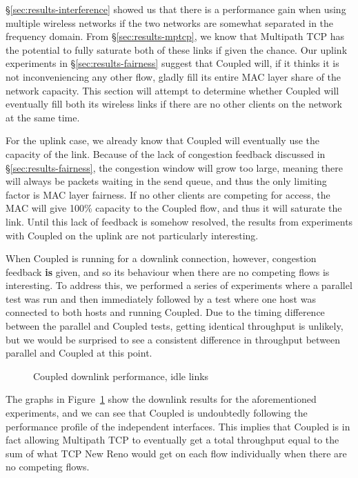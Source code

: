 \S\ref{sec:results-interference} showed us that there is a performance
gain when using multiple wireless networks if the two networks are somewhat 
separated in the frequency domain. From \S\ref{sec:results-mptcp}, we know that 
Multipath TCP has the potential to fully saturate both of these links if given 
the chance. Our uplink experiments in \S\ref{sec:results-fairness} suggest that 
Coupled will, if it thinks it is not inconveniencing any other flow, gladly fill 
its entire MAC layer share of the network capacity. This section will attempt to 
determine whether Coupled will eventually fill both its wireless links if there 
are no other clients on the network at the same time.

For the uplink case, we already know that Coupled will eventually use the
capacity of the link. Because of the lack of congestion feedback discussed in
\S\ref{sec:results-fairness}, the congestion window will grow too large,
meaning there will always be packets waiting in the send queue, and thus the
only limiting factor is MAC layer fairness. If no other clients are competing
for access, the MAC will give 100\% capacity to the Coupled flow, and thus it
will saturate the link. Until this lack of feedback is somehow resolved, the 
results from experiments with Coupled on the uplink are not particularly
interesting.

When Coupled is running for a downlink connection, however, congestion feedback
\textbf{is} given, and so its behaviour when there are no competing flows is 
interesting. To address this, we performed a series of 
experiments where a parallel test was run and then immediately followed by a 
test where one host was connected to both hosts and running Coupled. Due to the 
timing difference between the parallel and Coupled tests, getting identical 
throughput is unlikely, but we would be surprised to see a consistent difference 
in throughput between parallel and Coupled at this point.

\begin{figure}[h]
 \centering
 
 \caption{Coupled downlink performance, idle links}\label{graph:coupled-performance}
\end{figure}

The graphs in Figure~\ref{graph:coupled-performance} show the downlink results
for the aforementioned experiments, and we can see that Coupled is undoubtedly
following the performance profile of the independent interfaces. This implies
that Coupled is in fact allowing Multipath TCP to eventually get a total
throughput equal to the sum of what TCP New Reno would get on each flow
individually when there are no competing flows.
